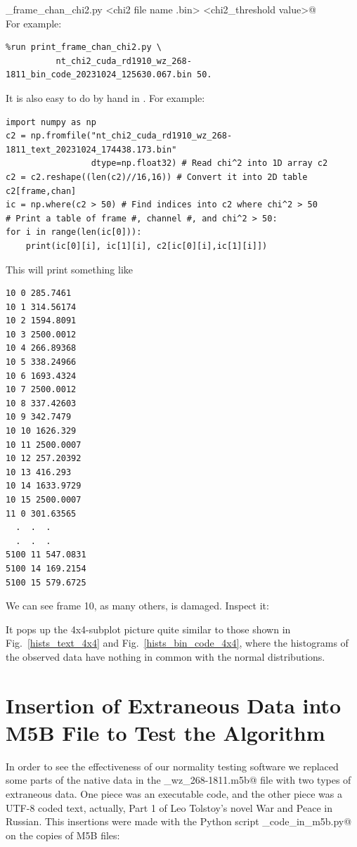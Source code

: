 \documentclass[letterpaper,twoside,12pt]{article}
\begin{document}
\noindent \verb@print_frame_chan_chi2.py <chi2 file name .bin> <chi2_threshold value>@ \\

\noindent For example:
\begin{verbatim}
%run print_frame_chan_chi2.py \
          nt_chi2_cuda_rd1910_wz_268-1811_bin_code_20231024_125630.067.bin 50.
\end{verbatim}

It is also easy to do by hand in \verb@IPython@. For example: 
\begin{verbatim}
import numpy as np
c2 = np.fromfile("nt_chi2_cuda_rd1910_wz_268-1811_text_20231024_174438.173.bin"
                 dtype=np.float32) # Read chi^2 into 1D array c2
c2 = c2.reshape((len(c2)//16,16)) # Convert it into 2D table c2[frame,chan]
ic = np.where(c2 > 50) # Find indices into c2 where chi^2 > 50
# Print a table of frame #, channel #, and chi^2 > 50:
for i in range(len(ic[0])):
    print(ic[0][i], ic[1][i], c2[ic[0][i],ic[1][i]])
\end{verbatim}

This will print something like
\begin{verbatim}
10 0 285.7461
10 1 314.56174
10 2 1594.8091
10 3 2500.0012
10 4 266.89368
10 5 338.24966
10 6 1693.4324
10 7 2500.0012
10 8 337.42603
10 9 342.7479
10 10 1626.329
10 11 2500.0007
10 12 257.20392
10 13 416.293
10 14 1633.9729
10 15 2500.0007
11 0 301.63565
  .  .  .  
  .  .  .  
5100 11 547.0831
5100 14 169.2154
5100 15 579.6725
\end{verbatim}

We can see frame 10, as many others, is damaged. Inspect it: \\

\noindent \verb@%run inspect_nt.py rd1910_wz_268-1811_text.m5b 056  10 1@ \\

It pops up the 4x4-subplot picture quite similar to those shown in Fig.~\ref{hists_text_4x4} and Fig.~\ref{hists_bin_code_4x4}, where the histograms of the observed data have nothing in common with the normal distributions. 

\section{Insertion of Extraneous Data into M5B File to Test the Algorithm}

In order to see the effectiveness of our normality testing software we replaced some parts of the native data in the _wz_268-1811.m5b@ file with two types of extraneous data. One piece was an executable code, and the other piece was a UTF-8 coded text, actually, Part 1 of Leo Tolstoy's novel War and Peace in Russian. This insertions were made with the Python script \verb@insert_code_in_m5b.py@ on the copies of M5B files:\\
\end{document}
